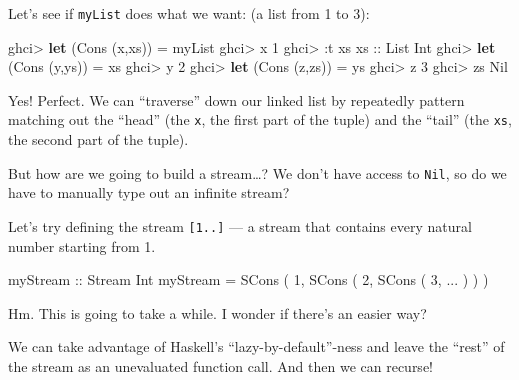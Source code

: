 \documentclass[]{article}
\newenvironment{Shaded}{}{}
\newcommand{\DataTypeTok}[1]{\textcolor[rgb]{0.56,0.13,0.00}{#1}}
\newcommand{\DecValTok}[1]{\textcolor[rgb]{0.25,0.63,0.44}{#1}}
\newcommand{\KeywordTok}[1]{\textcolor[rgb]{0.00,0.44,0.13}{\textbf{#1}}}
\newcommand{\NormalTok}[1]{#1}
\newcommand{\OperatorTok}[1]{\textcolor[rgb]{0.40,0.40,0.40}{#1}}
\newcommand{\OtherTok}[1]{\textcolor[rgb]{0.00,0.44,0.13}{#1}}
\begin{document}
Let's see if \texttt{myList} does what we want: (a list from 1 to 3):

\begin{Shaded}
\begin{Highlighting}[]
\NormalTok{ghci}\OperatorTok{\textgreater{}} \KeywordTok{let}\NormalTok{ (}\DataTypeTok{Cons}\NormalTok{ (x,xs)) }\OtherTok{=}\NormalTok{ myList}
\NormalTok{ghci}\OperatorTok{\textgreater{}}\NormalTok{ x}
\DecValTok{1}
\NormalTok{ghci}\OperatorTok{\textgreater{}} \OperatorTok{:}\NormalTok{t xs}
\OtherTok{xs ::} \DataTypeTok{List} \DataTypeTok{Int}
\NormalTok{ghci}\OperatorTok{\textgreater{}} \KeywordTok{let}\NormalTok{ (}\DataTypeTok{Cons}\NormalTok{ (y,ys)) }\OtherTok{=}\NormalTok{ xs}
\NormalTok{ghci}\OperatorTok{\textgreater{}}\NormalTok{ y}
\DecValTok{2}
\NormalTok{ghci}\OperatorTok{\textgreater{}} \KeywordTok{let}\NormalTok{ (}\DataTypeTok{Cons}\NormalTok{ (z,zs)) }\OtherTok{=}\NormalTok{ ys}
\NormalTok{ghci}\OperatorTok{\textgreater{}}\NormalTok{ z}
\DecValTok{3}
\NormalTok{ghci}\OperatorTok{\textgreater{}}\NormalTok{ zs}
\DataTypeTok{Nil}
\end{Highlighting}
\end{Shaded}

Yes! Perfect. We can ``traverse'' down our linked list by repeatedly pattern
matching out the ``head'' (the \texttt{x}, the first part of the tuple) and the
``tail'' (the \texttt{xs}, the second part of the tuple).

But how are we going to build a stream\ldots? We don't have access to
\texttt{Nil}, so do we have to manually type out an infinite stream?

Let's try defining the stream \texttt{{[}1..{]}} --- a stream that contains
every natural number starting from 1.

\begin{Shaded}
\begin{Highlighting}[]
\OtherTok{myStream\textquotesingle{} ::} \DataTypeTok{Stream} \DataTypeTok{Int}
\NormalTok{myStream\textquotesingle{} }\OtherTok{=} \DataTypeTok{SCons}\NormalTok{ ( }\DecValTok{1}\NormalTok{, }\DataTypeTok{SCons}\NormalTok{ ( }\DecValTok{2}\NormalTok{, }\DataTypeTok{SCons}\NormalTok{ ( }\DecValTok{3}\NormalTok{, }\OperatorTok{...}\NormalTok{ ) ) )}
\end{Highlighting}
\end{Shaded}

Hm. This is going to take a while. I wonder if there's an easier way?

We can take advantage of Haskell's ``lazy-by-default''-ness and leave the
``rest'' of the stream as an unevaluated function call. And then we can recurse!
\end{document}
